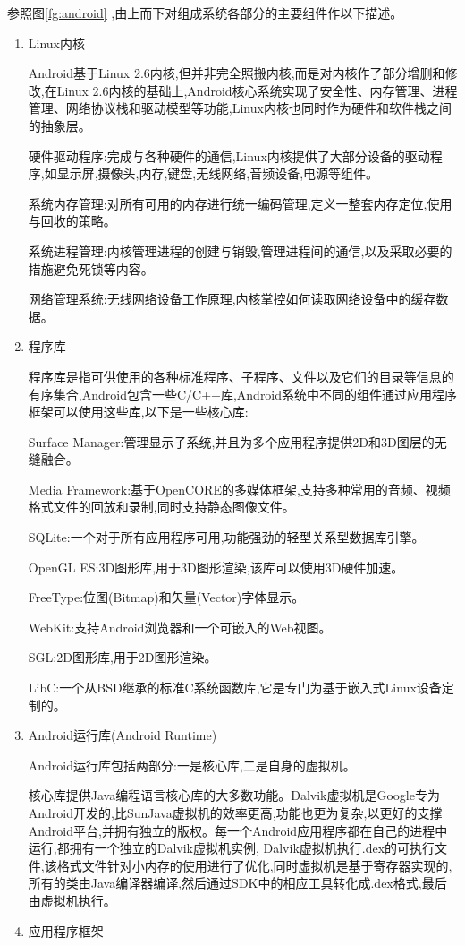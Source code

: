 \documentclass{XDBAthesis}
\begin{document}
参照图\ref{fg:android} ,由上而下对组成系统各部分的主要组件作以下描述。
\begin{enumerate}
    \item Linux内核 

    Android基于Linux 2.6内核,但并非完全照搬内核,而是对内核作了部分增删和修改,在Linux 2.6内核的基础上,Android核心系统实现了安全性、内存管理、进程管理、网络协议栈和驱动模型等功能,Linux内核也同时作为硬件和软件栈之间的抽象层。
    
    硬件驱动程序:完成与各种硬件的通信,Linux内核提供了大部分设备的驱动程序,如显示屏,摄像头,内存,键盘,无线网络,音频设备,电源等组件。 

系统内存管理:对所有可用的内存进行统一编码管理,定义一整套内存定位,使用与回收的策略。 

系统进程管理:内核管理进程的创建与销毁,管理进程间的通信,以及采取必要的措施避免死锁等内容。 

网络管理系统:无线网络设备工作原理,内核掌控如何读取网络设备中的缓存数据。 
    \item 程序库

程序库是指可供使用的各种标准程序、子程序、文件以及它们的目录等信息的有序集合,Android包含一些C/C++库,Android系统中不同的组件通过应用程序框架可以使用这些库,以下是一些核心库: 

    Surface Manager:管理显示子系统,并且为多个应用程序提供2D和3D图层的无缝融合。

    Media Framework:基于OpenCORE的多媒体框架,支持多种常用的音频、视频格式文件的回放和录制,同时支持静态图像文件。 

    SQLite:一个对于所有应用程序可用,功能强劲的轻型关系型数据库引擎。 

    OpenGL ES:3D图形库,用于3D图形渲染,该库可以使用3D硬件加速。 

    FreeType:位图(Bitmap)和矢量(Vector)字体显示。 

    WebKit:支持Android浏览器和一个可嵌入的Web视图。 

    SGL:2D图形库,用于2D图形渲染。 

    LibC:一个从BSD继承的标准C系统函数库,它是专门为基于嵌入式Linux设备定制的。 

    
    \item Android运行库(Android Runtime)

    Android运行库包括两部分:一是核心库,二是自身的虚拟机。 

    核心库提供Java编程语言核心库的大多数功能。Dalvik虚拟机是Google专为Android开发的,比SunJava虚拟机的效率更高,功能也更为复杂,以更好的支撑Android平台,并拥有独立的版权。每一个Android应用程序都在自己的进程中运行,都拥有一个独立的Dalvik虚拟机实例, Dalvik虚拟机执行.dex的可执行文件,该格式文件针对小内存的使用进行了优化,同时虚拟机是基于寄存器实现的,所有的类由Java编译器编译,然后通过SDK中的相应工具转化成.dex格式,最后由虚拟机执行。
    \item 应用程序框架


\end{enumerate}
\end{document}
